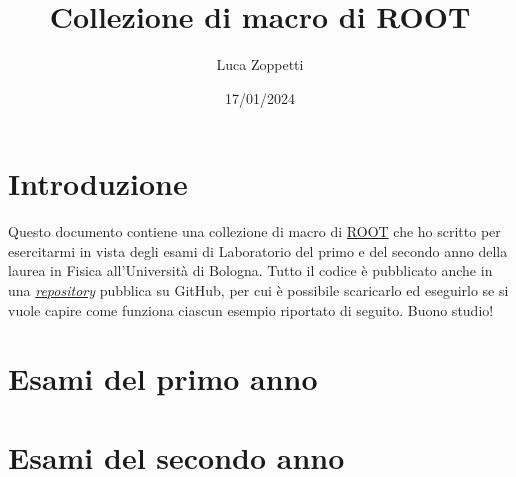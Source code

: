 \documentclass{article}
\title{Collezione di macro di ROOT}
\author{Luca Zoppetti}
\date{17/01/2024}
\begin{document}
\maketitle

\tableofcontents

\section*{Introduzione}
Questo documento contiene una collezione di macro di \href{https://root.cern}{ROOT} che ho scritto per esercitarmi in vista degli esami di Laboratorio del primo e del secondo anno della laurea in Fisica all'Università di Bologna. Tutto il codice è pubblicato anche in una \href{https://github.com/LuckeeDev/root}{\emph{repository}} pubblica su GitHub, per cui è possibile scaricarlo ed eseguirlo se si vuole capire come funziona ciascun esempio riportato di seguito. Buono studio!

\newpage

\section{Esami del primo anno}















\section{Esami del secondo anno}
\end{document}
